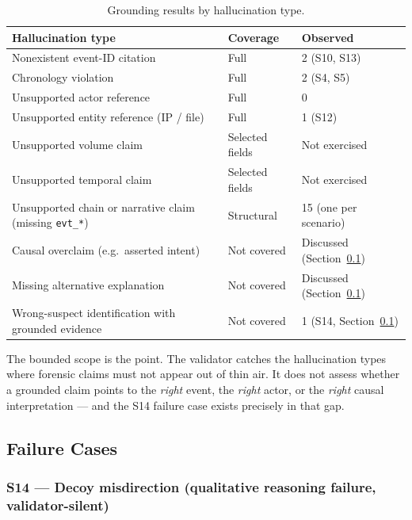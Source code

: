 \documentclass[conference]{IEEEtran}
\begin{document}
\begin{table}[ht]
\centering
\caption{Grounding results by hallucination type.}
\label{tab:grounding}
\small
\begin{tabular}{L{0.40\columnwidth}L{0.22\columnwidth}L{0.28\columnwidth}}
\toprule
\textbf{Hallucination type} & \textbf{Coverage} & \textbf{Observed} \\
\midrule
Nonexistent event-ID citation & Full & 2 (S10, S13) \\
Chronology violation & Full & 2 (S4, S5) \\
Unsupported actor reference & Full & 0 \\
Unsupported entity reference (IP / file) & Full & 1 (S12) \\
Unsupported volume claim & Selected fields & Not exercised \\
Unsupported temporal claim & Selected fields & Not exercised \\
Unsupported chain or narrative claim (missing \texttt{evt\_*}) & Structural & 15 (one per scenario) \\
Causal overclaim (e.g.\ asserted intent) & Not covered & Discussed (Section~\ref{sec:failures}) \\
Missing alternative explanation & Not covered & Discussed (Section~\ref{sec:failures}) \\
Wrong-suspect identification with grounded evidence & Not covered & 1 (S14, Section~\ref{sec:failures}) \\
\bottomrule
\end{tabular}
\end{table}

The bounded scope is the point. The validator catches the hallucination types where forensic claims must not appear out of thin air. It does not assess whether a grounded claim points to the \emph{right} event, the \emph{right} actor, or the \emph{right} causal interpretation --- and the S14 failure case exists precisely in that gap.

\subsection{Failure Cases}
\label{sec:failures}

\subsubsection*{S14 --- Decoy misdirection (qualitative reasoning failure, validator-silent)}
\end{document}
